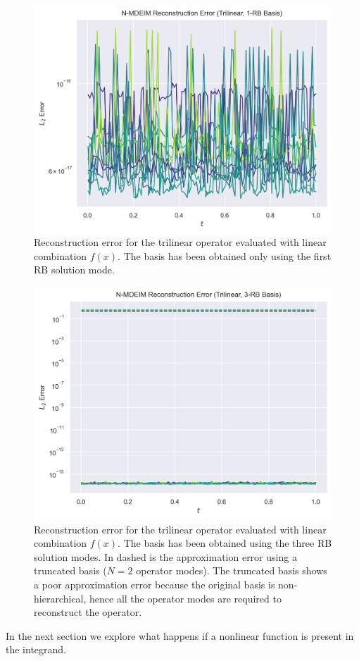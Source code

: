 \documentclass[../../thesis.tex]{subfiles}
\begin{document}
\begin{figure}[h]
    \includegraphics[width=\columnwidth]{research_project/piston/figures/svd_fourier/trilinear_nonlinear/rb_basis_mdeim_errors_trilinear_num_1.png}
    \caption{Reconstruction error for the trilinear operator evaluated with linear combination $f(x)$.
    The basis has been obtained only using the first RB solution mode.}
    \label{fig:appendix_rb_trilinear_num_1}
\end{figure}
\begin{figure}[h]
    \includegraphics[width=\columnwidth]{research_project/piston/figures/svd_fourier/trilinear_nonlinear/rb_basis_mdeim_errors_trilinear_num_3.png}
    \caption{Reconstruction error for the trilinear operator evaluated with linear combination $f(x)$.
    The basis has been obtained using the three RB solution modes.
    In dashed is the approximation error using a truncated basis ($N=2$ operator modes). 
    The truncated basis shows a poor approximation error because the original basis is non-hierarchical, 
    hence all the operator modes are required to reconstruct the operator.}
    \label{fig:appendix_rb_trilinear_num_3}
\end{figure}
In the next section we explore what happens if a nonlinear function is present in the integrand.
\end{document}
